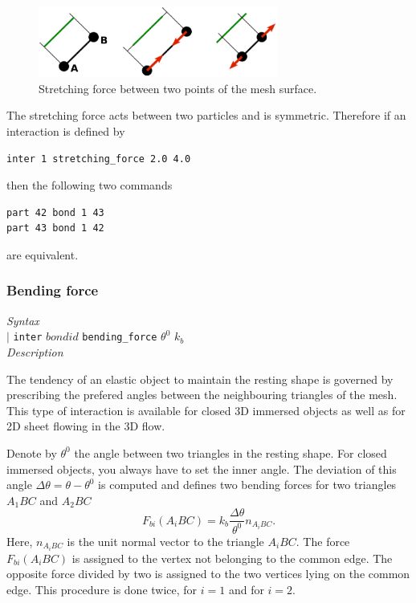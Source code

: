\documentclass[a4paper]{article}
\begin{document}
\begin{figure}[h]
   \centering
      \includegraphics[width=0.7\textwidth]{figures/stretching.eps}
      \caption{Stretching force between two points of the mesh surface.}
\end{figure}
The stretching force acts between two particles and is symmetric. Therefore if an interaction is defined by
\begin{verbatim} 
inter 1 stretching_force 2.0 4.0
\end{verbatim}
then the following two commands
\begin{verbatim} 
part 42 bond 1 43
part 43 bond 1 42
\end{verbatim}
are equivalent.

\subsubsection{Bending force}
\textit{Syntax}\\
\hspace*{0.3 cm} $\mid$ \texttt{inter} $bondid$ \texttt{bending\_force} $\theta^0$ $k_b$ \\
\newline
\textit{Description}\newline

The tendency of an elastic object to maintain the resting shape is governed by prescribing the prefered angles between the neighbouring triangles of the mesh. This type of interaction is available for closed 3D immersed objects as well as for 2D sheet flowing in the 3D flow.


Denote by $\theta^0$ the angle between two triangles in the resting shape. For closed immersed objects, you always have to set the inner angle. The deviation of this angle $\Delta \theta = \theta - \theta^0$ is computed and defines two bending forces for two triangles $A_1BC$ and $A_2BC$
$$
F_{bi}(A_iBC) = k_b\frac{\Delta \theta}{\theta^0}n_{A_iBC}.
$$
Here, $n_{A_iBC}$ is the unit normal vector to the triangle $A_iBC$. The force $F_{bi}(A_iBC)$ is assigned to the vertex not belonging to the common edge. The opposite force divided by two is assigned to the two vertices lying on the common edge. This procedure is done twice, for $i=1$ and for $i=2$.
\end{document}
